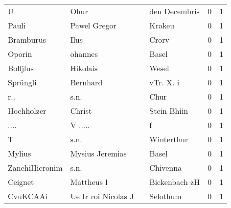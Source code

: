 \documentclass[10pt,a4paper,landscape]{article}
\begin{document}
\begin{longtable}{llllrr}
                        U &                               Ohur &             &                               den Decembris &          0 &         1 \\
                    Pauli &                       Pawel Gregor &             &                                      Krakeu &          0 &         1 \\
                Bramburus &                               Ilus &             &                                       Crorv &          0 &         1 \\
                   Oporin &                            ohannes &             &                                       Basel &          0 &         1 \\
                 Bolljlus &                           Hikolais &             &                                       Wesel &          0 &         1 \\
                 Sprüngli &                           Bernhard &             &                                   vTr. X. i &          0 &         1 \\
                      r.. &                               s.n. &             &                                        Chur &          0 &         1 \\
               Hoehholzer &                             Christ &             &                                 Stein Bhiin &          0 &         1 \\
                     .... &                            V ..... &             &                                           f &          0 &         1 \\
                        T &                               s.n. &             &                                  Winterthur &          0 &         1 \\
                   Mylius &                    Mysius Jeremias &             &                                       Basel &          0 &         1 \\
           ZanehiHieronim &                               s.n. &             &                                    Chivenna &          0 &         1 \\
                  Ceignet &                         Mattheus l &             &                               Bickenbach zH &          0 &         1 \\
                 CvuKCAAi &                Ue Ir roi Nicolas J &             &                                    Selothum &          0 &         1 \\

\end{longtable}
\end{document}
